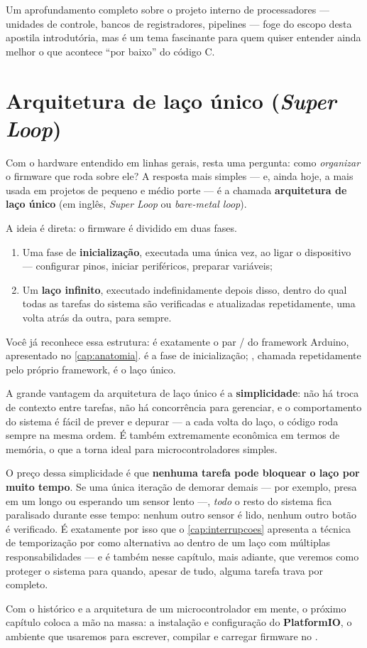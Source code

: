 \begin{nota}
Um aprofundamento completo sobre o projeto interno de processadores — unidades de controle, bancos de registradores, pipelines — foge do escopo desta apostila introdutória, mas é um tema fascinante para quem quiser entender ainda melhor o que acontece ``por baixo'' do código C.
\end{nota}

\section{Arquitetura de laço único (\emph{Super Loop})}
\label{sec:super-loop}

Com o hardware entendido em linhas gerais, resta uma pergunta: como \emph{organizar} o firmware que roda sobre ele? A resposta mais simples — e, ainda hoje, a mais usada em projetos de pequeno e médio porte — é a chamada \textbf{arquitetura de laço único} (em inglês, \emph{Super Loop} ou \emph{bare-metal loop}).

A ideia é direta: o firmware é dividido em duas fases.

\begin{enumerate}
    \item Uma fase de \textbf{inicialização}, executada uma única vez, ao ligar o dispositivo — configurar pinos, iniciar periféricos, preparar variáveis;
    \item Um \textbf{laço infinito}, executado indefinidamente depois disso, dentro do qual todas as tarefas do sistema são verificadas e atualizadas repetidamente, uma volta atrás da outra, para sempre.
\end{enumerate}

Você já reconhece essa estrutura: é exatamente o par  /  do framework Arduino, apresentado no \cref{cap:anatomia}.  é a fase de inicialização; , chamada repetidamente pelo próprio framework, é o laço único.

A grande vantagem da arquitetura de laço único é a \textbf{simplicidade}: não há troca de contexto entre tarefas, não há concorrência para gerenciar, e o comportamento do sistema é fácil de prever e depurar — a cada volta do laço, o código roda sempre na mesma ordem. É também extremamente econômica em termos de memória, o que a torna ideal para microcontroladores simples.

O preço dessa simplicidade é que \textbf{nenhuma tarefa pode bloquear o laço por muito tempo}. Se uma única iteração de  demorar demais — por exemplo, presa em um  longo ou esperando um sensor lento —, \emph{todo} o resto do sistema fica paralisado durante esse tempo: nenhum outro sensor é lido, nenhum outro botão é verificado. É exatamente por isso que o \cref{cap:interrupcoes} apresenta a técnica de temporização por  como alternativa ao  dentro de um laço com múltiplas responsabilidades — e é também nesse capítulo, mais adiante, que veremos como proteger o sistema para quando, apesar de tudo, alguma tarefa trava por completo.

Com o histórico e a arquitetura de um microcontrolador em mente, o próximo capítulo coloca a mão na massa: a instalação e configuração do \textbf{PlatformIO}, o ambiente que usaremos para escrever, compilar e carregar firmware no \ESP{}.
